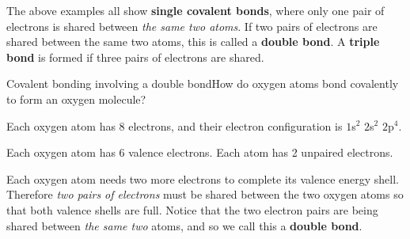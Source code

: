 The above examples all show \textbf{single covalent bonds}, where only one pair of electrons is shared between \textit{the same two atoms}. If two pairs of electrons are shared between the same two atoms, this is called a \textbf{double bond}. A \textbf{triple bond} is formed if three pairs of electrons are shared.\\

\begin{wex}{Covalent bonding involving a double bond}{How do oxygen atoms bond covalently to form an oxygen molecule?}
{
Each oxygen atom has 8 electrons, and their electron configuration is $1$s$^{2}$ $2$s$^{2}$ $2$p$^{4}$.

Each oxygen atom has 6 valence electrons. Each atom has 2 unpaired electrons.


Each oxygen atom needs two more electrons to complete its valence energy shell. Therefore \textit{two pairs of electrons} must be shared between the two oxygen atoms so that both valence shells are full. Notice that the two electron pairs are being shared between \textit{the same two} atoms, and so we call this a \textbf{double bond}.

\begin{figure}[H]
\end{figure}}
\end{wex}
